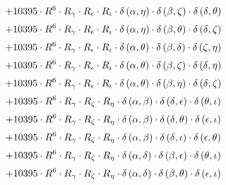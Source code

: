 \begin{subequations}
\begin{gather}
 \\[0.2em] \notag 		 + 10395 \cdot R^{6} \cdot R_{\gamma{}} \cdot R_{\epsilon{}} \cdot R_{\iota{}} \cdot \delta{}\left(\alpha{}, \eta{}\right) \cdot \delta{}\left(\beta{}, \zeta{}\right) \cdot \delta{}\left(\delta{}, \theta{}\right) 
 \\[0.2em] \notag 		 + 10395 \cdot R^{6} \cdot R_{\gamma{}} \cdot R_{\epsilon{}} \cdot R_{\iota{}} \cdot \delta{}\left(\alpha{}, \eta{}\right) \cdot \delta{}\left(\beta{}, \theta{}\right) \cdot \delta{}\left(\delta{}, \zeta{}\right) 
 \\[0.2em] \notag 		 + 10395 \cdot R^{6} \cdot R_{\gamma{}} \cdot R_{\epsilon{}} \cdot R_{\iota{}} \cdot \delta{}\left(\alpha{}, \theta{}\right) \cdot \delta{}\left(\beta{}, \delta{}\right) \cdot \delta{}\left(\zeta{}, \eta{}\right) 
 \\[0.2em] \notag 		 + 10395 \cdot R^{6} \cdot R_{\gamma{}} \cdot R_{\epsilon{}} \cdot R_{\iota{}} \cdot \delta{}\left(\alpha{}, \theta{}\right) \cdot \delta{}\left(\beta{}, \zeta{}\right) \cdot \delta{}\left(\delta{}, \eta{}\right) 
 \\[0.2em] \notag 		 + 10395 \cdot R^{6} \cdot R_{\gamma{}} \cdot R_{\epsilon{}} \cdot R_{\iota{}} \cdot \delta{}\left(\alpha{}, \theta{}\right) \cdot \delta{}\left(\beta{}, \eta{}\right) \cdot \delta{}\left(\delta{}, \zeta{}\right) 
 \\[0.2em] \notag 		 + 10395 \cdot R^{6} \cdot R_{\gamma{}} \cdot R_{\zeta{}} \cdot R_{\eta{}} \cdot \delta{}\left(\alpha{}, \beta{}\right) \cdot \delta{}\left(\delta{}, \epsilon{}\right) \cdot \delta{}\left(\theta{}, \iota{}\right) 
 \\[0.2em] \notag 		 + 10395 \cdot R^{6} \cdot R_{\gamma{}} \cdot R_{\zeta{}} \cdot R_{\eta{}} \cdot \delta{}\left(\alpha{}, \beta{}\right) \cdot \delta{}\left(\delta{}, \theta{}\right) \cdot \delta{}\left(\epsilon{}, \iota{}\right) 
 \\[0.2em] \notag 		 + 10395 \cdot R^{6} \cdot R_{\gamma{}} \cdot R_{\zeta{}} \cdot R_{\eta{}} \cdot \delta{}\left(\alpha{}, \beta{}\right) \cdot \delta{}\left(\delta{}, \iota{}\right) \cdot \delta{}\left(\epsilon{}, \theta{}\right) 
 \\[0.2em] \notag 		 + 10395 \cdot R^{6} \cdot R_{\gamma{}} \cdot R_{\zeta{}} \cdot R_{\eta{}} \cdot \delta{}\left(\alpha{}, \delta{}\right) \cdot \delta{}\left(\beta{}, \epsilon{}\right) \cdot \delta{}\left(\theta{}, \iota{}\right) 
 \\[0.2em] \notag 		 + 10395 \cdot R^{6} \cdot R_{\gamma{}} \cdot R_{\zeta{}} \cdot R_{\eta{}} \cdot \delta{}\left(\alpha{}, \delta{}\right) \cdot \delta{}\left(\beta{}, \theta{}\right) \cdot \delta{}\left(\epsilon{}, \iota{}\right) 

\end{gather}
\end{subequations}
